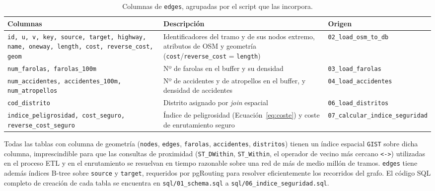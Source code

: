 \begin{table}[htbp]
\centering
\small
\begin{tabular}{p{4cm}p{5.2cm}p{3cm}}
\hline
\textbf{Columnas} & \textbf{Descripción} & \textbf{Origen} \\
\hline
\texttt{\small id, u, v, key, source, target, highway, name, oneway, length, cost, reverse\_cost, geom} & Identificadores del tramo y de sus nodos extremo, atributos de OSM y geometría (\texttt{cost}/\texttt{reverse\_cost} = \texttt{length}) & \texttt{\small 02\_load\_osm\_to\_db} \\
\hline
\texttt{num\_farolas, farolas\_100m} & Nº de farolas en el buffer y su densidad & \texttt{\small 03\_load\_farolas} \\
\hline
\texttt{\small num\_accidentes, accidentes\_100m, num\_atropellos} & Nº de accidentes y de atropellos en el buffer, y densidad de accidentes & \texttt{\small 04\_load\_accidentes} \\
\hline
\texttt{cod\_distrito} & Distrito asignado por \textit{join} espacial & \texttt{\small 06\_load\_distritos} \\
\hline
\texttt{\small indice\_peligrosidad, cost\_seguro, reverse\_cost\_seguro} & Índice de peligrosidad (Ecuación~\ref{eq:coste}) y coste de enrutamiento seguro & \texttt{\small 07\_calcular\_}\newline\texttt{\small indice\_seguridad} \\
\hline
\end{tabular}
\caption{Columnas de \texttt{edges}, agrupadas por el script que las incorpora.}
\label{tab:columnas_edges}
\end{table}

\begin{sloppypar}
Todas las tablas con columna de geometría (\texttt{nodes}, \texttt{edges}, \texttt{farolas}, \texttt{accidentes}, \texttt{distritos}) tienen un índice espacial \texttt{GIST} sobre dicha columna, imprescindible para que las consultas de proximidad (\texttt{ST\_DWithin}, \texttt{ST\_Within}, el operador de vecino más cercano \texttt{<->}) utilizadas en el proceso ETL y en el enrutamiento se resuelvan en tiempo razonable sobre una red de más de medio millón de tramos. \texttt{edges} tiene además índices B-tree sobre \texttt{source} y \texttt{target}, requeridos por pgRouting para resolver eficientemente los recorridos del grafo. El código SQL completo de creación de cada tabla se encuentra en \texttt{sql/01\_schema.sql} a \texttt{sql/06\_indice\_seguridad.sql}.
\end{sloppypar}

